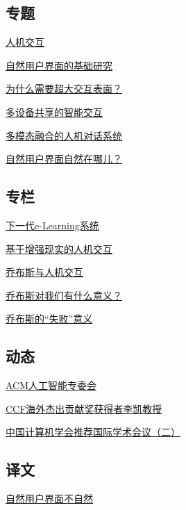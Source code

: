 \documentclass[a4paper]{article}
\begin{document}
\subsection{专题}
\href{http://history.ccf.org.cn/resources/1190201776262/2011/12/01/1.pdf}{人机交互}

\href{http://history.ccf.org.cn/resources/1190201776262/2011/12/01/2.pdf}{自然用户界面的基础研究}

\href{http://history.ccf.org.cn/resources/1190201776262/2011/12/01/4.pdf}{为什么需要超大交互表面？}

\href{http://history.ccf.org.cn/resources/1190201776262/2011/12/01/5.pdf}{多设备共享的智能交互}

\href{http://history.ccf.org.cn/resources/1190201776262/2011/12/01/6.pdf}{多模态融合的人机对话系统}

\href{http://history.ccf.org.cn/resources/1190201776262/2011/12/01/3.pdf}{自然用户界面自然在哪儿？}

\subsection{专栏}
\href{http://history.ccf.org.cn/resources/1190201776262/2011/12/01/11.pdf}{下一代e-Learning系统}

\href{http://history.ccf.org.cn/resources/1190201776262/2011/12/01/10.pdf}{基于增强现实的人机交互}

\href{http://history.ccf.org.cn/resources/1190201776262/2011/12/01/9.pdf}{乔布斯与人机交互}

\href{http://history.ccf.org.cn/resources/1190201776262/2011/12/01/7.pdf}{乔布斯对我们有什么意义？}

\href{http://history.ccf.org.cn/resources/1190201776262/2011/12/01/8.pdf}{乔布斯的“失败”意义}

\subsection{动态}
\href{http://history.ccf.org.cn/resources/1190201776262/2011/12/01/13.pdf}{ACM人工智能专委会}

\href{http://history.ccf.org.cn/resources/1190201776262/2011/12/01/12.pdf}{CCF海外杰出贡献奖获得者李凯教授}

\href{http://history.ccf.org.cn/resources/1190201776262/2011/12/01/14.pdf}{中国计算机学会推荐国际学术会议（二）}

\subsection{译文}
\href{http://history.ccf.org.cn/resources/1190201776262/2011/12/01/17.pdf}{自然用户界面不自然}
\end{document}
